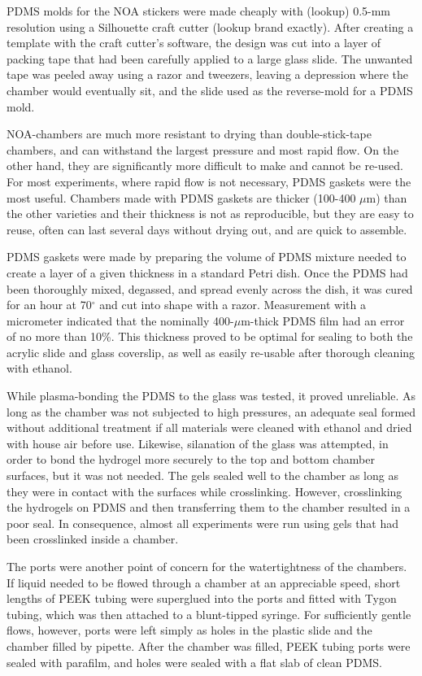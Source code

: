 PDMS molds for the NOA stickers were made cheaply with (lookup) 0.5-mm resolution using a Silhouette craft cutter (lookup brand exactly).  After creating a template with the craft cutter's software, the design was cut into a layer of packing tape that had been carefully applied to a large glass slide. The unwanted tape was peeled away using a razor and tweezers, leaving a depression where the chamber would eventually sit, and the slide used as the reverse-mold for a PDMS mold.

NOA-chambers are much more resistant to drying than double-stick-tape chambers, and can withstand the largest pressure and most rapid flow.  On the other hand, they are significantly more difficult to make and cannot be re-used.  For most experiments, where rapid flow is not necessary, PDMS gaskets were the most useful.  Chambers made with PDMS gaskets are thicker (100-400 $\mu$m) than the other varieties and their thickness is not as reproducible, but they are easy to reuse, often can last several days without drying out, and are quick to assemble.  

PDMS gaskets were made by preparing the volume of PDMS mixture needed to create a layer of a given thickness in a standard Petri dish.  Once the PDMS had been thoroughly mixed, degassed, and spread evenly across the dish, it was cured for an hour at 70$^\circ$ and cut into shape with a razor.  Measurement with a micrometer indicated that the nominally 400-$\mu$m-thick PDMS film had an error of no more than 10\%.  This thickness proved to be optimal for sealing to both the acrylic slide and glass coverslip, as well as easily re-usable after thorough cleaning with ethanol.

While plasma-bonding the PDMS to the glass was tested, it proved unreliable.  As long as the chamber was not subjected to high pressures, an adequate seal formed without additional treatment if all materials were cleaned with ethanol and dried with house air before use. Likewise, silanation of the glass was attempted, in order to bond the hydrogel more securely to the top and bottom chamber surfaces, but it was not needed.  The gels sealed well to the chamber as long as they were in contact with the surfaces while crosslinking.  However, crosslinking the hydrogels on PDMS and then transferring them to the chamber resulted in a poor seal.  In consequence, almost all experiments were run using gels that had been crosslinked inside a chamber.

The ports were another point of concern for the watertightness of the chambers.  If liquid needed to be flowed through a chamber at an appreciable speed, short lengths of PEEK tubing were superglued into the ports and fitted with Tygon tubing, which was then attached to a blunt-tipped syringe.  For sufficiently gentle flows, however, ports were left simply as holes in the plastic slide and the chamber filled by pipette.  After the chamber was filled, PEEK tubing ports were sealed with parafilm, and holes were sealed with a flat slab of clean PDMS.

